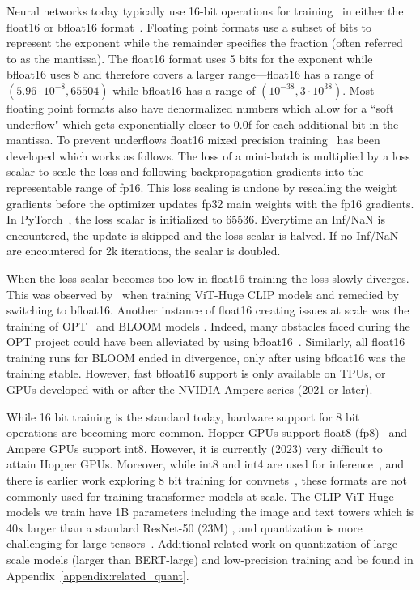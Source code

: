 Neural networks today typically use 16-bit operations for training~\cite{micikevicius2017mixed} in either the float16 or bfloat16 format~\cite{wang2019bfloat16}. Floating point formats use a subset of bits to represent the exponent while the remainder specifies the fraction (often referred to as the mantissa). The float16 format uses 5 bits for the exponent while bfloat16 uses 8 and therefore covers a larger range---float16 has a range of $(5.96 \cdot 10^{-8}, 65504)$ while bfloat16 has a range of $(10^{-38}, 3 \cdot 10^{38})$. Most floating point formats also have denormalized numbers which allow for a ``soft underflow" which gets exponentially closer to 0.0f for each additional bit in the mantissa. To prevent underflows float16 mixed precision training~\cite{micikevicius2017mixed} has been developed which works as follows. The loss of a mini-batch is multiplied by a loss scalar to scale the loss and following backpropagation gradients into the representable range of fp16. This loss scaling is undone by rescaling the weight gradients before the optimizer updates fp32 main weights with the fp16 gradients. In PyTorch~\cite{paszke2019pytorch}, the loss scalar is initialized to 65536. Everytime an Inf/NaN is encountered, the update is skipped and the loss scalar is halved. If no Inf/NaN are encountered for 2k iterations, the scalar is doubled.

When the loss scalar becomes too low in float16 training the loss slowly diverges. This was observed by~\citet{cherti2022reproducible} when training ViT-Huge CLIP models and remedied by switching to bfloat16. Another instance of float16 creating issues at scale was the training of  OPT~\cite{zhang2022opt} and BLOOM models \citep{scao2022bloom}. Indeed, many obstacles faced during the OPT project could have been alleviated by using bfloat16~\cite{optvideo}. Similarly, all float16 training runs for BLOOM ended in divergence, only after using bfloat16 was the training stable. However, fast bfloat16 support is only available on TPUs, or GPUs developed with or after the NVIDIA Ampere series (2021 or later).

While 16 bit training is the standard today, hardware support for 8 bit operations are becoming more common. Hopper GPUs support float8 (fp8)~\cite{micikevicius2022fp8} and Ampere GPUs support int8. However, it is currently (2023) very difficult to attain Hopper GPUs. Moreover, while int8 and int4 are used for inference~\cite{dettmers2022llm, xiao2022smoothquant, dettmers2022case}, and there is earlier work exploring 8 bit training for convnets~\cite{NEURIPS2018_335d3d1c, zhu2020towards, cho2021dkm}, these formats are not commonly used for training transformer models at scale. The CLIP ViT-Huge models we train have 1B parameters including the image and text towers which is 40x larger than a standard ResNet-50 (23M) \citep{he2016deep}, and quantization is more challenging for large tensors~\cite{dettmers2022llm}. Additional related work on quantization of large scale models (larger than BERT-large) and low-precision training and be found in Appendix~\ref{appendix:related_quant}.

